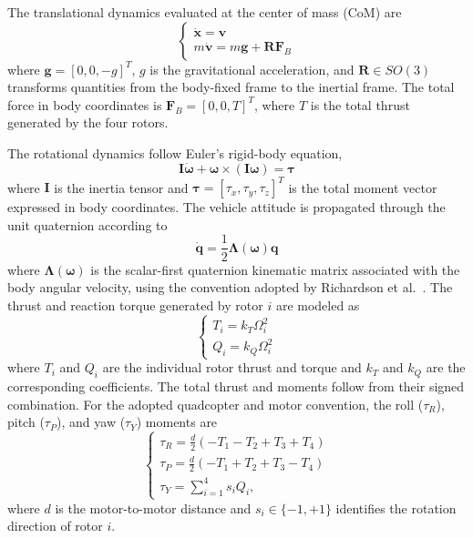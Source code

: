 \documentclass[journal]{IEEEtran}
\begin{document}
The translational dynamics evaluated at the center of mass (CoM) are
%
\begin{equation}
\begin{cases}
{\dot{\mathbf{x}}=\mathbf{v}}\\
{m\dot{\mathbf{v}}=m\mathbf{g}+\mathbf{R}\mathbf{F}_{B}}
\end{cases}
\label{eq_vehicle_trasl}
\end{equation}
where $\mathbf{g}=[0,0,-g]^T$, $g$ is the gravitational acceleration, and $\mathbf{R}\in SO(3)$ transforms quantities from the body-fixed frame to the inertial frame. The total force in body coordinates is $\mathbf{F}_{B}=[0,0,T]^T$, where $T$ is the total thrust generated by the four rotors.
%

The rotational dynamics follow Euler's rigid-body equation,
%
\begin{equation}
\mathbf{I}\dot{\boldsymbol{\omega}}
+
\boldsymbol{\omega}
\times
(\mathbf{I}\boldsymbol{\omega})
= \boldsymbol{\tau}
\label{eq_vehicle_rot}
\end{equation}
where $\mathbf{I}$ is the inertia tensor and $\boldsymbol{\tau}=[\tau_x,\tau_y,\tau_z]^T$ is the total moment vector expressed in body coordinates.
%
The vehicle attitude is propagated through the unit quaternion according to
%
\begin{equation}
\dot{\mathbf q} = \frac{1}{2}
\mathbf{\Lambda}(\boldsymbol{\omega})\mathbf q
\label{eq_vehicle_attitude}
\end{equation}
where $\mathbf{\Lambda}(\boldsymbol{\omega})$ is the scalar-first quaternion kinematic matrix associated with the body angular velocity, using the convention adopted by Richardson et al.~\cite{Richardson2025}.
%
The thrust and reaction torque generated by rotor $i$ are modeled as
%
\begin{equation}
\begin{cases}
{T_i=k_T\Omega_i^2}\\
{Q_i=k_Q\Omega_i^2}
\end{cases}
\label{eq_T_and_Q}
\end{equation}
where $T_i$ and $Q_i$ are the individual rotor thrust and torque and $k_T$ and $k_Q$ are the corresponding coefficients. The total thrust and moments follow from their signed combination.
%
For the adopted quadcopter and motor convention, the roll ($\tau_R$), pitch ($\tau_P$), and yaw ($\tau_Y$) moments are
%
\begin{equation}
\begin{cases}
{\tau_R=
\frac{d}{2}
\left(
-T_1-T_2+T_3+T_4
\right)}\\
{\tau_P=
\frac{d}{2}
\left(
-T_1+T_2+T_3-T_4
\right)}\\
{\tau_Y=
\sum_{i=1}^{4}s_iQ_i,}
\end{cases}
\label{eq_RP_moments}
\end{equation}
where $d$ is the motor-to-motor distance and $s_i\in\{-1,+1\}$ identifies the rotation direction of rotor $i$.
%
\end{document}
